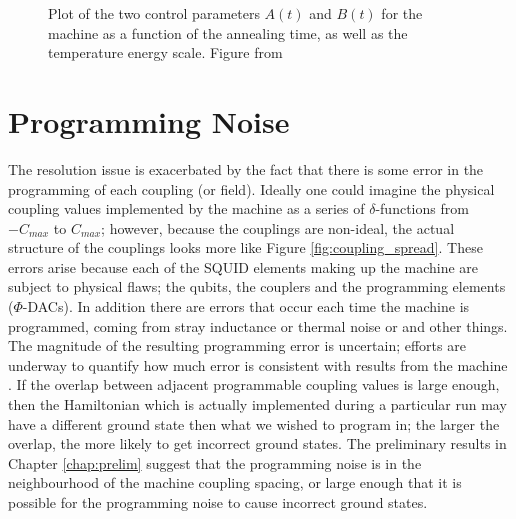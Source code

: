 \begin{figure}
	\caption[\machine Evolution Trajectory]{Plot of the two control parameters $A(t)$ and $B(t)$ for the \machine machine as a function of the annealing time, as well as the temperature energy scale.  Figure from \cite{pudenz}}
	\label{fig:trajectory}
\end{figure}

\section{Programming Noise}
\label{sec:noise}
The resolution issue is exacerbated by the fact that there is some error in the programming of each coupling (or field).  Ideally one could imagine the physical coupling values implemented by the machine as a series of $\delta$-functions from $-C_{max}$ to $C_{max}$; however, because the couplings are non-ideal, the actual structure of the couplings looks more like Figure \ref{fig:coupling_spread}.  These errors arise because each of the SQUID elements making up the machine are subject to physical flaws; the qubits, the couplers and the programming elements ($\Phi$-DACs). In addition there are errors that occur each time the machine is programmed, coming from stray inductance or thermal noise or and other things.  The magnitude of the resulting programming error is uncertain; efforts are underway to quantify how much error is consistent with results from the machine \cite{aaron}.  If the overlap between adjacent programmable coupling values is large enough, then the Hamiltonian which is actually implemented during a particular run may have a different ground state then what we wished to program in; the larger the overlap, the more likely to get incorrect ground states.  The preliminary results in Chapter \ref{chap:prelim} suggest that the programming noise is in the neighbourhood of the machine coupling spacing, or large enough that it is possible for the programming noise to cause incorrect ground states.

